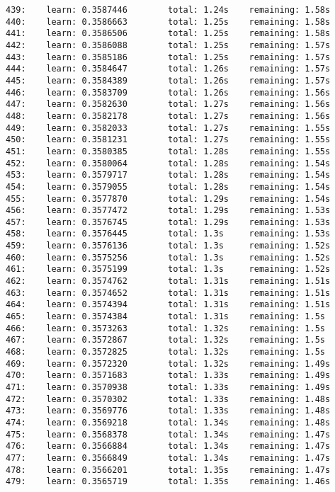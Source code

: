 \documentclass[11pt]{article}
\begin{document}
\begin{Verbatim}[commandchars=\\\{\}]
439:    learn: 0.3587446        total: 1.24s    remaining: 1.58s
440:    learn: 0.3586663        total: 1.25s    remaining: 1.58s
441:    learn: 0.3586506        total: 1.25s    remaining: 1.58s
442:    learn: 0.3586088        total: 1.25s    remaining: 1.57s
443:    learn: 0.3585186        total: 1.25s    remaining: 1.57s
444:    learn: 0.3584647        total: 1.26s    remaining: 1.57s
445:    learn: 0.3584389        total: 1.26s    remaining: 1.57s
446:    learn: 0.3583709        total: 1.26s    remaining: 1.56s
447:    learn: 0.3582630        total: 1.27s    remaining: 1.56s
448:    learn: 0.3582178        total: 1.27s    remaining: 1.56s
449:    learn: 0.3582033        total: 1.27s    remaining: 1.55s
450:    learn: 0.3581231        total: 1.27s    remaining: 1.55s
451:    learn: 0.3580385        total: 1.28s    remaining: 1.55s
452:    learn: 0.3580064        total: 1.28s    remaining: 1.54s
453:    learn: 0.3579717        total: 1.28s    remaining: 1.54s
454:    learn: 0.3579055        total: 1.28s    remaining: 1.54s
455:    learn: 0.3577870        total: 1.29s    remaining: 1.54s
456:    learn: 0.3577472        total: 1.29s    remaining: 1.53s
457:    learn: 0.3576745        total: 1.29s    remaining: 1.53s
458:    learn: 0.3576445        total: 1.3s     remaining: 1.53s
459:    learn: 0.3576136        total: 1.3s     remaining: 1.52s
460:    learn: 0.3575256        total: 1.3s     remaining: 1.52s
461:    learn: 0.3575199        total: 1.3s     remaining: 1.52s
462:    learn: 0.3574762        total: 1.31s    remaining: 1.51s
463:    learn: 0.3574652        total: 1.31s    remaining: 1.51s
464:    learn: 0.3574394        total: 1.31s    remaining: 1.51s
465:    learn: 0.3574384        total: 1.31s    remaining: 1.5s
466:    learn: 0.3573263        total: 1.32s    remaining: 1.5s
467:    learn: 0.3572867        total: 1.32s    remaining: 1.5s
468:    learn: 0.3572825        total: 1.32s    remaining: 1.5s
469:    learn: 0.3572320        total: 1.32s    remaining: 1.49s
470:    learn: 0.3571683        total: 1.33s    remaining: 1.49s
471:    learn: 0.3570938        total: 1.33s    remaining: 1.49s
472:    learn: 0.3570302        total: 1.33s    remaining: 1.48s
473:    learn: 0.3569776        total: 1.33s    remaining: 1.48s
474:    learn: 0.3569218        total: 1.34s    remaining: 1.48s
475:    learn: 0.3568378        total: 1.34s    remaining: 1.47s
476:    learn: 0.3566884        total: 1.34s    remaining: 1.47s
477:    learn: 0.3566849        total: 1.34s    remaining: 1.47s
478:    learn: 0.3566201        total: 1.35s    remaining: 1.47s
479:    learn: 0.3565719        total: 1.35s    remaining: 1.46s

\end{Verbatim}
\end{document}
